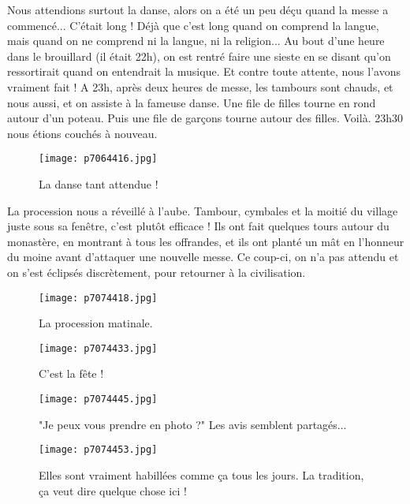 \documentclass{book}
\begin{document}
Nous attendions surtout la danse, alors on a été un peu déçu quand la messe a commencé... C'était long ! Déjà que c'est long quand on comprend la langue, mais quand on ne comprend ni la langue, ni la religion... Au bout d'une heure dans le brouillard (il était 22h), on est rentré faire une sieste en se disant qu'on ressortirait quand on entendrait la musique. Et contre toute attente, nous l'avons vraiment fait ! A 23h, après deux heures de messe, les tambours sont chauds, et nous aussi, et on assiste à la fameuse danse. Une file de filles tourne en rond autour d'un poteau. Puis une file de garçons tourne autour des filles. Voilà. 23h30 nous étions couchés à nouveau.


\begin{figure}[h]
\centering
\texttt{[image: p7064416.jpg]}
\caption*{La danse tant attendue !}
\end{figure}

La procession nous a réveillé à l'aube. Tambour, cymbales et la moitié du village juste sous sa fenêtre, c'est plutôt efficace ! Ils ont fait quelques tours autour du monastère, en montrant à tous les offrandes, et ils ont planté un mât en l'honneur du moine avant d'attaquer une nouvelle messe. Ce coup-ci, on n'a pas attendu et on s'est éclipsés discrètement, pour retourner à la civilisation.


\begin{figure}[h]
\centering
\texttt{[image: p7074418.jpg]}
\caption*{La procession matinale.}
\end{figure}


\begin{figure}[h]
\centering
\texttt{[image: p7074433.jpg]}
\caption*{C'est la fête !}
\end{figure}


\begin{figure}[h]
\centering
\texttt{[image: p7074445.jpg]}
\caption*{"Je peux vous prendre en photo ?" Les avis semblent partagés...}
\end{figure}


\begin{figure}[h]
\centering
\texttt{[image: p7074453.jpg]}
\caption*{Elles sont vraiment habillées comme ça tous les jours. La tradition, ça veut dire quelque chose ici !}
\end{figure}
\end{document}
